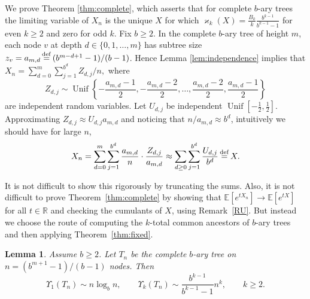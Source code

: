 \documentclass[11pt]{article}
\newcommand{\E}[1]{\mathbb{E} \left[#1\right]}
\def\R{\mathbb{R}}
\newcommand{\dep}{d}
\numberwithin{theorem}{section}
\newtheorem{lemma}[theorem]{Lemma}
\theoremstyle{definition}
\newcommand{\eqd}{\,{\buildrel {\mathrm{def}} \over =}\,}
\newcommand{\Unif}{\mathop{\mathrm{Unif}}}
\numberwithin{equation}{section}
\newcommand{\refT}[1]{Theorem~\ref{#1}}
\newcommand{\refR}[1]{Remark~\ref{#1}}
\newcommand\kk{\varkappa}
\begin{document}
We prove Theorem \ref{thm:complete}, which asserts that for complete $b$-ary
trees the limiting variable of $X_n$ is the unique $X$ for which $\kk_k(X) =
\frac{B_k}{k}\frac{b^{k-1}}{b^{k-1}-1}$ for even $k\geq 2$ and zero for
odd
 $k$. Fix $b\geq 2$.  In the complete $b$-ary tree 
of height $m$,
each node $v$ at depth $d\in\{0,1,\dots,m\}$ has subtree size $z_v =
a_{m, d} \eqd (b^{m-d+1}-1)/(b-1)$. Hence Lemma \ref{lem:independence} implies that
\(
X_n 
= \sum_{\dep=0}^m \sum_{j=1}^{b^\dep} {Z_{\dep, j}}/{n},
\)
where
\[
Z_{\dep, j} \sim \Unif
\left\{-\frac{a_{m, \dep}-1}{2},
-\frac{a_{m, \dep}-2}{2},
\dots,
\frac{a_{m, \dep}-2}{2},
\frac{a_{m, \dep}-1}{2}
\right\}
\]
are independent random variables.
Let \(U_{\dep,j}\) be independent \(\Unif[-\frac{1}{2},
\frac{1}{2}]\). Approximating $Z_{d, j} \approx U_{d, j}a_{m, d}$ and noticing that $n/a_{m,\dep}\approx b^d$, intuitively we should have for large $n$,
\begin{equation}
    X_n =
    \sum_{\dep=0}^m \sum_{j=1}^{b^\dep} \frac{a_{m,\dep}}{n} 
\cdot\frac{Z_{\dep, j}}{a_{m,\dep}}
    \approx 
    \sum_{\dep \ge 0} \sum_{j=1}^{b^\dep} \frac{U_{\dep,j}}{b^\dep} 
    \eqd X.
    \label{eq:b:limit}
\end{equation}

It is not difficult 
to show this rigorously by truncating the sums.
Also,
it is not difficult 
to prove \refT{thm:complete} by showing that \(\E{e^{tX_n}} \to \E{e^{tX}}\) for
all \(t \in \R\) and checking the cumulants of \(X\),
using \refR{RU}.
But instead we choose the  route of computing
the \(k\)-total common ancestors of \(b\)-ary trees and then applying
\refT{thm:fixed}.

\begin{lemma}
    \label{lem:B:common}
    Assume \(b \ge 2\).
    Let \(T_n\) be the complete \(b\)-ary tree on \(n = (b^{m+1} - 1)/(b-1)\) nodes.
    Then
    \[
        \Upsilon_{1}(T_n) \sim n \log_{b}n, 
        \qquad
        \Upsilon_{k}(T_n) \sim \frac{b^{k-1}}{b^{k-1}-1} n^{k},
        \qquad
        k \ge 2
        .
    \]
\end{lemma}
\end{document}
